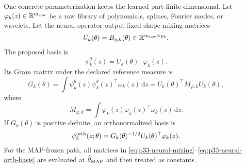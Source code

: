 \documentclass[11pt]{article}
\numberwithin{equation}{section}
\newcommand{\dd}{\,\mathrm d}
\begin{document}
One concrete parameterization keeps the learned part finite-dimensional.  Let
\(\varphi_k(z)\in\mathbb R^{m_{\rm raw}}\) be a raw library of polynomials,
splines, Fourier modes, or wavelets.  Let the neural operator output fixed
shape mixing matrices
\begin{equation}
    U_k(\theta)=B_{\eta,k}(\theta)\in\mathbb R^{m_{\rm raw}\times p_k}.
    \label{eq:p33-neural-mixing}
\end{equation}
The proposed basis is
\begin{equation}
    \psi_k^\theta(z)
    =
    U_k(\theta)^\top \varphi_k(z).
    \label{eq:p33-neural-raw-basis}
\end{equation}
Its Gram matrix under the declared reference measure is
\begin{equation}
    G_k(\theta)
    =
    \int
    \psi_k^\theta(z)\psi_k^\theta(z)^\top\omega_k(z)\dd z
    =
    U_k(\theta)^\top M_{\varphi,k}U_k(\theta),
    \label{eq:p33-neural-gram}
\end{equation}
where
\begin{equation}
    M_{\varphi,k}
    =
    \int\varphi_k(z)\varphi_k(z)^\top\omega_k(z)\dd z.
    \label{eq:p33-neural-raw-mass}
\end{equation}
If \(G_k(\theta)\) is positive definite, an orthonormalized basis is
\begin{equation}
    \psi_k^{\rm orth}(z;\theta)
    =
    G_k(\theta)^{-1/2}U_k(\theta)^\top\varphi_k(z).
    \label{eq:p33-neural-orth-basis}
\end{equation}
For the MAP-frozen path, all matrices in
\eqref{eq:p33-neural-mixing}--\eqref{eq:p33-neural-orth-basis} are evaluated
at \(\widehat\theta_{\rm MAP}\) and then treated as constants.
\end{document}

